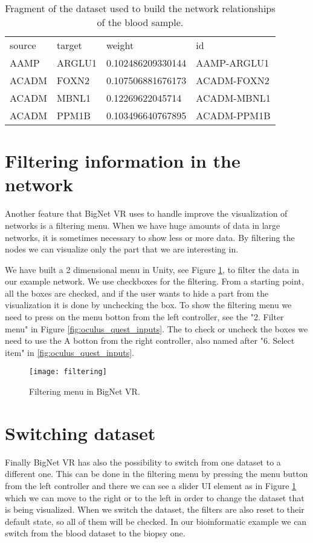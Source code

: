 \begin{table}[h!]
\centering
\begin{tabular}{llll}
\hline
source & target & weight            & id          \\
AAMP   & ARGLU1 & 0.102486209330144 & AAMP-ARGLU1 \\
ACADM  & FOXN2  & 0.107506881676173 & ACADM-FOXN2 \\
ACADM  & MBNL1  & 0.12269622045714  & ACADM-MBNL1 \\
ACADM  & PPM1B  & 0.103496640767895 & ACADM-PPM1B \\
\hline
\end{tabular}
\caption{Fragment of the dataset used to build the network relationships of the blood sample.}
\label{tab:network-data}
\end{table}

\section{Filtering information in the network}
Another feature that BigNet VR uses to handle improve the visualization of networks is a filtering menu. When we have huge amounts of data in large networks, it is sometimes necessary to show less or more data. By filtering the nodes we can visualize only the part that we are interesting in.

We have built a 2 dimensional menu in Unity, see Figure \ref{fig:filtering}, to filter the data in our example network. We use checkboxes for the filtering. From a starting point, all the boxes are checked, and if the user wants to hide a part from the visualization it is done by unchecking the box. To show the filtering menu we need to press on the menu botton from the left controller, see the "2. Filter menu" in Figure \ref{fig:oculus_quest_inputs}. The to check or uncheck the boxes we need to use the A botton from the right controller, also named after "6. Select item" in \ref{fig:oculus_quest_inputs}.

\begin{figure}[h!]
    \centering%
    \texttt{[image: filtering]}
    \caption{Filtering menu in BigNet VR.}
    \label{fig:filtering}
\end{figure}%

\section{Switching dataset}
Finally BigNet VR has also the possibility to switch from one dataset to a different one. This can be done in the filtering menu by pressing the menu button from the left controller and there we can see a slider UI element as in Figure \ref{fig:filtering} which we can move to the right or to the left in order to change the dataset that is being visualized. When we switch the dataset, the filters are also reset to their default state, so all of them will be checked. In our bioinformatic example we can switch from the blood dataset to the biopsy one.

